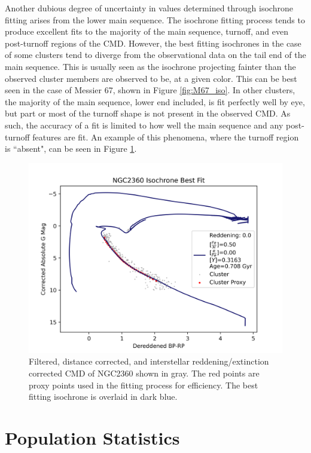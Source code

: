 \documentclass[onecolumn,table,xcdraw,super]{aastex631}
\begin{document}
Another dubious degree of uncertainty in values determined through isochrone fitting arises from the lower main sequence. The isochrone fitting process tends to produce excellent fits to the majority of the main sequence, turnoff, and even post-turnoff regions of the CMD. However, the best fitting isochrones in the case of some clusters tend to diverge from the observational data on the tail end of the main sequence. This is usually seen as the isochrone projecting fainter than the observed cluster members are observed to be, at a given color. This can be best seen in the case of Messier 67, shown in Figure \ref{fig:M67_iso}. In other clusters, the majority of the main sequence, lower end included, is fit perfectly well by eye, but part or most of the turnoff shape is not present in the observed CMD. As such, the accuracy of a fit is limited to how well the main sequence and any post-turnoff features are fit. An example of this phenomena, where the turnoff region is ``absent", can be seen in Figure \ref{fig:NGC2360_iso}.

\begin{figure}[]
    \centering
      \includegraphics[width=4.75in]{figures/NGC2360_CMD_Iso_BestFit.png}
    \caption{Filtered, distance corrected, and interstellar reddening/extinction corrected CMD of NGC2360 shown in gray. The red points are proxy points used in the fitting process for efficiency. The best fitting isochrone is overlaid in dark blue.}
    \label{fig:NGC2360_iso}
\end{figure}


\section{Population Statistics} \label{sec:pop}
\end{document}
